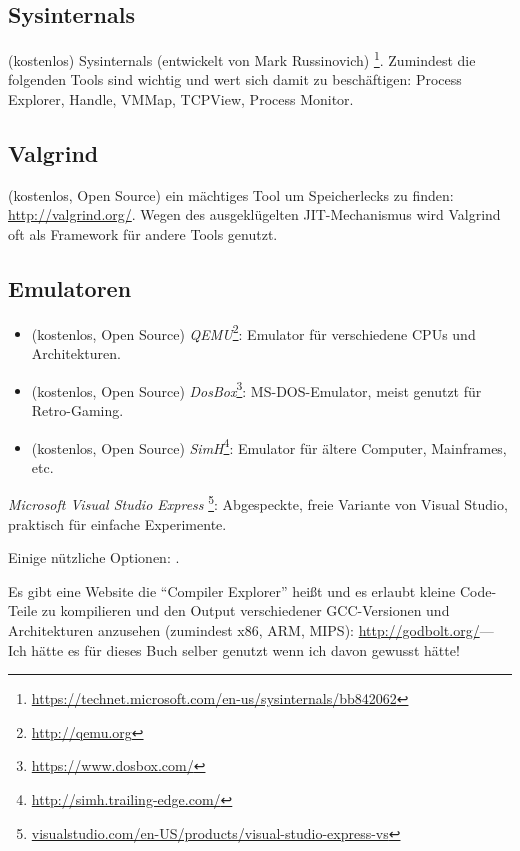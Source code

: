 \subsection{Sysinternals}

(kostenlos) Sysinternals (entwickelt von Mark Russinovich)
\footnote{\url{https://technet.microsoft.com/en-us/sysinternals/bb842062}}.
Zumindest die folgenden Tools sind wichtig und wert sich damit zu beschäftigen:
Process Explorer, Handle, VMMap, TCPView, Process Monitor.

\subsection{Valgrind}

(kostenlos, Open Source) ein mächtiges Tool um Speicherlecks zu finden: \url{http://valgrind.org/}.
Wegen des ausgeklügelten \ac{JIT}-Mechanismus wird Valgrind oft als Framework für andere Tools genutzt.


\subsection{Emulatoren}

\begin{itemize}
\item (kostenlos, Open Source) \emph{QEMU}\footnote{\url{http://qemu.org}}: Emulator für verschiedene CPUs und Architekturen.

\item (kostenlos, Open Source) \emph{DosBox}\footnote{\url{https://www.dosbox.com/}}: MS-DOS-Emulator, meist genutzt für Retro-Gaming.

\item (kostenlos, Open Source) \emph{SimH}\footnote{\url{http://simh.trailing-edge.com/}}: Emulator für ältere Computer, Mainframes, etc.
\end{itemize}


\emph{Microsoft Visual Studio Express}
\footnote{\href{http://www.microsoft.com/express/Downloads/}{visualstudio.com/en-US/products/visual-studio-express-vs}}:
Abgespeckte, freie Variante von Visual Studio, praktisch für einfache Experimente.

Einige nützliche Optionen: .

Es gibt eine Website die ``Compiler Explorer'' heißt und es erlaubt kleine Code-Teile zu kompilieren
und den Output verschiedener GCC-Versionen und Architekturen anzusehen (zumindest x86, ARM, MIPS):
\url{http://godbolt.org/}---Ich hätte es für dieses Buch selber genutzt wenn ich davon gewusst hätte!

